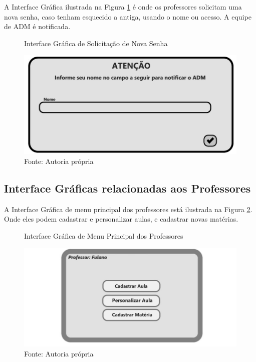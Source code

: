 \documentclass{utfpr-pg}
\begin{document}
    A Interface Gráfica ilustrada na Figura \ref{fig:5} é onde os professores solicitam uma nova senha, caso tenham esquecido a antiga, usando o nome ou acesso. A equipe de ADM é notificada.
       
        \begin{figure}[H]
            \centering
            \captionsetup{width=0.9\textwidth}
            \caption{Interface Gráfica de Solicitação de Nova Senha}
            \includegraphics[width=\linewidth]{fotos/5.jpg}
            \caption*{Fonte: Autoria própria}
            \label{fig:5}
        \end{figure}

   \subsection{Interface Gráficas relacionadas aos Professores}
   
    A Interface Gráfica de menu principal dos professores está ilustrada na Figura \ref{fig:6}. Onde eles podem cadastrar e personalizar aulas, e cadastrar novas matérias.
       
        \begin{figure}[H]
            \centering
            \captionsetup{width=0.9\textwidth}
            \caption{Interface Gráfica de Menu Principal dos Professores}
            \includegraphics[width=\linewidth]{fotos/6.jpg}
            \caption*{Fonte: Autoria própria}
            \label{fig:6}
        \end{figure}
    
\end{document}
